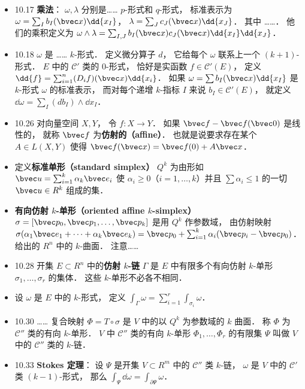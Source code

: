 \begin{itemize}
\item 10.17 \textbf{乘法}： $\omega,\lambda$ 分别是…… $p$-形式和 $q$-形式， 标准表示为 $\omega=\sum_I b_I(\bvec x)\dd{x_I}$， $\lambda=\sum_J c_J(\bvec x)\dd{x_J}$． 其中 ……． 他们的乘积定义为 $\omega\wedge\lambda = \sum_{I,J}b_I(\bvec x)c_J(\bvec x)\dd{x_I}\dd{x_J}$．

\item 10.18 $\omega$ 是 …… $k$-形式． 定义微分算子 $d$， 它给每个 $\omega$ 联系上一个 $(k+1)$-形式． $E$ 中的 $\mathscr C'$ 类的 $0$-形式， 恰好是实函数 $f\in \mathscr C'(E)$， 定义 $\dd{f}=\sum_{i=1}^n (D_i f)(\bvec x)\dd{x_i}$． 如果 $\omega=\sum b_I(\bvec x)\dd{x_I}$ 是 $k$-形式 $\omega$ 的标准表示， 而对每个递增 $k$-指标 $I$ 来说 $b_I\in \mathscr C'(E)$， 就定义 $\dd{\omega} = \sum_I (db_I)\wedge \dd{x_I}$．

\item 10.26 对向量空间 $X,Y$， 令 $f:X\to Y$． 如果 $\bvec f-\bvec f(\bvec 0)$ 是线性的， 就称 $\bvec f$ 为\textbf{仿射的（affine）}． 也就是说要求存在某个 $A\in L(X,Y)$ 使得 $\bvec f(\bvec x) = \bvec f(0)+A\bvec x$．

\item 定义\textbf{标准单形（standard simplex）} $Q^k$ 为由形如 $\bvec u = \sum_{i=1}^k \alpha_k\bvec e_i$ 使 $\alpha_i\geqslant 0$（$i=1,\dots,k$）并且 $\sum \alpha_i\leqslant 1$ 的一切 $\bvec u\in R^k$ 组成的集．

\item \textbf{有向仿射 $k$-单形（oriented affine $k$-simplex）} $\sigma = [\bvec p_0,\bvec p_1,\dots,\bvec p_k]$ 是用 $Q^k$ 作参数域， 由仿射映射 $\sigma(\alpha_1\bvec e_1+\dots+\alpha_k\bvec e_k) = \bvec p_0 + \sum_{i=1}^k \alpha_i(\bvec p_i-\bvec p_0)$． 给出的 $R^n$ 中的 $k$-曲面． 注意……

\item 10.28 开集 $E\subset R^n$ 中的\textbf{仿射 $k$-链} $\Gamma$ 是 $E$ 中有限多个有向仿射 $k$-单形 $\sigma_1,\dots,\sigma_r$ 的集体． 这些 $k$-单形不必各不相同．

\item 设 $\omega$ 是 $E$ 中的 $k$-形式， 定义 $\int_\Gamma \omega = \sum_{i=1}^r \int_{\sigma_i}\omega$．

\item 10.30 …… 复合映射 $\Phi=T\circ\sigma$ 是 $V$ 中的以 $Q^k$ 为参数域的 $k$ 曲面． 称 $\Phi$ 为 $\mathscr C''$ 类的有向 $k$-单形． $V$ 中 $\mathscr C''$ 类的有向 $k$-单形 $\Phi_1,\dots,\Phi_r$ 的有限集 $\Psi$ 叫做 $V$ 中的 $\mathscr C''$ 类的 $k$-链．

\item 10.33 \textbf{Stokes 定理}： 设 $\Psi$ 是开集 $V\subset R^m$ 中的 $\mathscr C''$ 类 $k$-链， $\omega$ 是 $V$ 中的 $\mathscr C'$ 类 $(k-1)$-形式， 那么 $\int_\Psi\dd{\omega}=\int_{\partial \Psi}\omega$．
\end{itemize}


